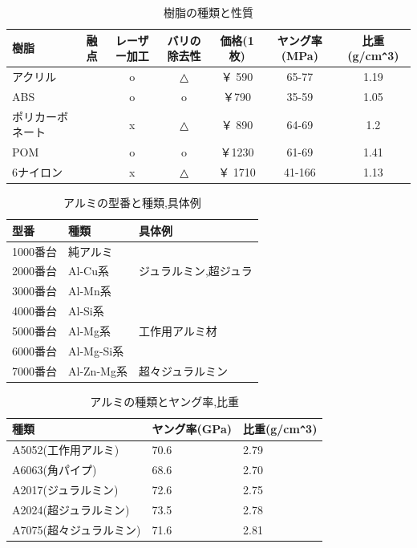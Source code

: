 \documentclass[b5paper, 9pt, twocolumn, titlepage,openany]{jsbook}%
\begin{document}
\newpage
\begin{table}[htb]
  \begin{center}
    \caption{樹脂の種類と性質}
    \begin{tabular}{|l|c|c|c|c|c|c|} \hline
      樹脂 & 融点 & レーザー加工 & バリの除去性  & 価格(1枚) & ヤング率(MPa) & 比重(g/cm\verb|^|3)\\ \hline
      アクリル        & & o & △  &￥ 590   &65-77  & 1.19 \\ \hline
      ABS             & & o & o  & ￥790  & 35-59  & 1.05\\ \hline
      ポリカーボネート& & x & △  &￥ 890   &64-69  & 1.2 \\ \hline
      POM             & & o & o  & ￥1230 & 61-69  & 1.41\\ \hline
      6ナイロン       & & x & △  &￥ 1710  &41-166  &1.13 \\ \hline
    \end{tabular}
    \label{plastic_table}
  \end{center}
\end{table}

\begin{table}[htb]
  \begin{center}
    \caption{アルミの型番と種類,具体例}
    \begin{tabular}{|l|l|l|} \hline
      型番 & 種類 & 具体例 \\ \hline
      1000番台& 純アルミ &  \\ \hline
      2000番台& Al-Cu系 & ジュラルミン,超ジュラ \\ \hline
      3000番台& Al-Mn系 &  \\ \hline
      4000番台& Al-Si系 &  \\ \hline
      5000番台& Al-Mg系 & 工作用アルミ材 \\ \hline
      6000番台& Al-Mg-Si系 &  \\ \hline
      7000番台& Al-Zn-Mg系 & 超々ジュラルミン \\ \hline
    \end{tabular}
    \label{alminium_num_table}
  \end{center}
\end{table}

\begin{table}[htb]
  \begin{center}
    \caption{アルミの種類とヤング率,比重}
    \begin{tabular}{|l|l|l|} \hline
      種類 & ヤング率(GPa) & 比重(g/cm\verb|^|3) \\ \hline
      A5052(工作用アルミ)& 70.6 & 2.79 \\ \hline
      A6063(角パイプ)& 68.6 & 2.70 \\ \hline
      A2017(ジュラルミン)& 72.6 & 2.75 \\ \hline
      A2024(超ジュラルミン)& 73.5 & 2.78 \\ \hline
      A7075(超々ジュラルミン)& 71.6 & 2.81 \\ \hline
    \end{tabular}
    \label{alminium_num_table}
  \end{center}
\end{table}
\end{document}
